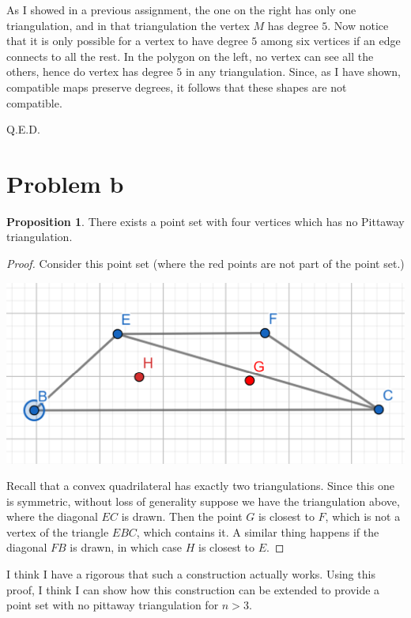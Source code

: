 \documentclass[12pt]{article}
\theoremstyle{definition}
\newtheorem{proposition}{Proposition}
\begin{document}
As I showed in a previous assignment, the one on the right has only one triangulation, and in that triangulation the vertex $M$ has degree $5$. Now notice that it is only possible for a vertex to have degree $5$ among six vertices if an edge connects to all the rest. In the polygon on the left, no vertex can see all the others, hence do vertex has degree $5$ in any triangulation. Since, as I have shown, compatible maps preserve degrees, it follows that these shapes are not compatible.

Q.E.D.

\section{Problem b}

\begin{proposition}
There exists a point set with four vertices which has no Pittaway triangulation.
\end{proposition}

\begin{proof}
Consider this point set (where the red points are not part of the point set.)

\includegraphics[scale=1]{not_pittaway.png} 

Recall that a convex quadrilateral has exactly two triangulations. Since this one is symmetric, without loss of generality suppose we have the triangulation above, where the diagonal $ EC $ is drawn. Then the point $G$ is closest to $F$, which is not a vertex of the triangle $EBC$, which contains it. A similar thing happens if the diagonal $FB$ is drawn, in which case $H$ is closest to $E$. 
\end{proof}

I think I have a rigorous that such a construction actually works. Using this proof, I think I can show how this construction can be extended to provide a point set with no pittaway triangulation for $n>3$.
\end{document}
